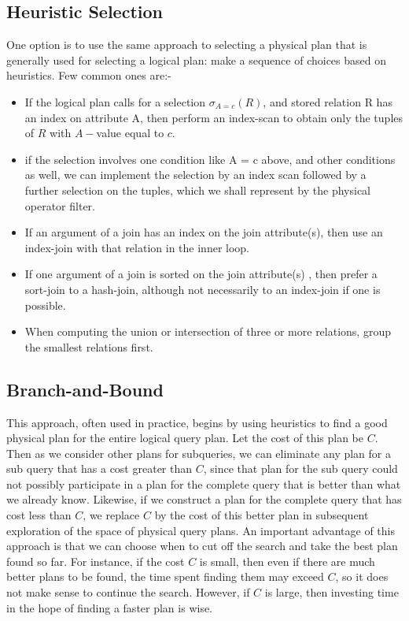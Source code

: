 \subsection{Heuristic Selection}
One option is to use the same approach to selecting a physical plan that is
generally used for selecting a logical plan: make a sequence of choices based
on heuristics. Few common ones are:-
\begin{itemize}
    \item If the logical plan calls for a selection  $\sigma_{A=c}(R)$, and stored relation R has an index on attribute A, then perform an index-scan to obtain only the tuples of $R$ with $A-$value equal to $c$.
    \item if the selection involves one condition like A = c above, and other conditions as well, we can implement the selection by an index­ scan followed by a further selection on the tuples, which we shall represent by the physical operator filter.
    \item If an argument of a join has an index on the join attribute(s), then use an index-join with that relation in the inner loop.
    \item If one argument of a join is sorted on the join attribute(s) , then prefer a sort-join to a hash-join, although not necessarily to an index-join if one is possible.
    \item When computing the union or intersection of three or more relations, group the smallest relations first.
\end{itemize}

\subsection{Branch-and-Bound}
This approach, often used in practice, begins by using heuristics to find a good physical plan for the entire logical query plan. Let the cost of this plan be $C$. Then as we consider other plans for subqueries, we can eliminate any plan for a sub query that has a cost greater than $C$, since that plan for the sub query could not possibly participate in a plan for the complete query that is better than what we already know. Likewise, if we construct a plan for the complete query that has cost less than $C$, we replace $C$ by the cost of this better plan in subsequent exploration of the space of physical query plans. An important advantage of this approach is that we can choose when to cut off the search and take the best plan found so far. For instance, if the cost $C$ is small, then even if there are much better plans to be found, the time spent finding them may exceed $C$, so it does not make sense to continue the search. However, if $C$ is large, then investing time in the hope of finding a faster plan is wise.

